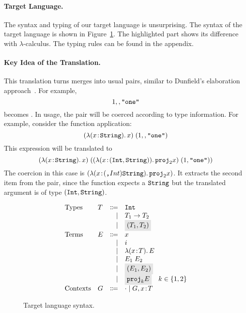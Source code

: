 \paragraph{Target Language.}
The syntax and typing of our target language is unsurprising. The syntax of the
target language is shown in Figure~\ref{fig:f-syntax}. The highlighted part
shows its difference with $\lambda$-calculus. The typing rules can be found
in the appendix.


\paragraph{Key Idea of the Translation.}
This translation turns merges into usual pairs, similar to Dunfield's
elaboration approach~\cite{dunfield2014elaborating}.
For example, \[ 1 ,, \texttt{"one"} \] becomes 
{}. In usage, the pair will be coerced according to type
information. For example, consider the function application: \[ (\lambda (x \!:\! \texttt{String}).\, x) \; (1 ,, \texttt{"one"}) \] This expression will be translated to \[ (\lambda (x \!:\! \texttt{String}).\, x) \; ((\lambda (x \!:\! (\texttt{Int}, \texttt{String})).\, {\texttt{proj}}_{2} x) \; (1, \texttt{"one"})) \] The coercion in this case is $(\lambda (x \!:\! (\texttt{,} Int) \texttt{String}).\, {\texttt{proj}}_{2} x)$. It extracts the second item from the pair, since
the function expects a $\texttt{String}$ but the translated argument is of type $(\texttt{Int}, \texttt{String})$.


\begin{figure}[h]
  \[
    \begin{array}{llrl}
      \text{Types}    & T & \Coloneqq & \code{Int} \\
                      &   & \mid      & {T_1} \to {T_2} \\
                      &   & \mid      & \highlight {$ \pair {T_1} {T_2} $} \\
      \text{Terms}    & E & \Coloneqq & x \\
                      &   & \mid      & i \\
                      &   & \mid      & \lamty x T E \\
                      &   & \mid      & \app {E_1} {E_2} \\
                      &   & \mid      & \highlight {$ \pair {E_1} {E_2} $} \\
                      &   & \mid      & \highlight {$ \proj k E $} \quad k \in \{ 1, 2 \} \\
      \text{Contexts} & G & \Coloneqq & \cdot \mid G, x \oftype T \\
    \end{array}
  \]
  \caption{Target language syntax.}
  \label{fig:f-syntax}
\end{figure}

